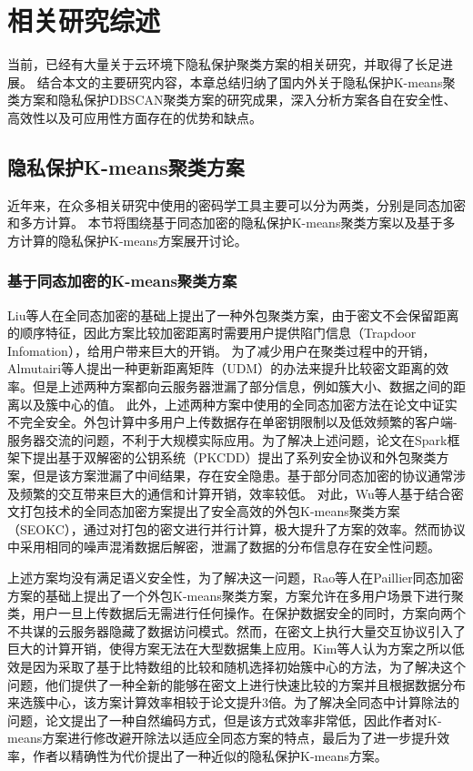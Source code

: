 \chapter{相关研究综述}
当前，已经有大量关于云环境下隐私保护聚类方案的相关研究，并取得了长足进展。
结合本文的主要研究内容，本章总结归纳了国内外关于隐私保护K-means聚类方案和隐私保护DBSCAN聚类方案的研究成果，深入分析方案各自在安全性、高效性以及可应用性方面存在的优势和缺点。

\section{隐私保护K-means聚类方案}
近年来，在众多相关研究中使用的密码学工具主要可以分为两类，分别是同态加密和多方计算。
本节将围绕基于同态加密的隐私保护K-means聚类方案以及基于多方计算的隐私保护K-means方案展开讨论。

\subsection{基于同态加密的K-means聚类方案}
Liu等人\cite{liu2014privacy}在全同态加密的基础上提出了一种外包聚类方案，由于密文不会保留距离的顺序特征，因此方案比较加密距离时需要用户提供陷门信息（Trapdoor Infomation），给用户带来巨大的开销。 
为了减少用户在聚类过程中的开销，Almutairi等人\cite{almutairi2017k}提出一种更新距离矩阵（UDM）的办法来提升比较密文距离的效率。但是上述两种方案都向云服务器泄漏了部分信息，例如簇大小、数据之间的距离以及簇中心的值。
此外，上述两种方案中使用的全同态加密方法在论文\cite{wang2015notes}中证实不完全安全。外包计算中多用户上传数据存在单密钥限制以及低效频繁的客户端-服务器交流的问题，不利于大规模实际应用。为了解决上述问题，论文\cite{rong2017privacy}在Spark框架下提出基于双解密的公钥系统（PKCDD）提出了系列安全协议和外包聚类方案，但是该方案泄漏了中间结果，存在安全隐患。基于部分同态加密的协议通常涉及频繁的交互带来巨大的通信和计算开销，效率较低。
对此，Wu等人\cite{wu2020secure}基于结合密文打包技术的全同态加密方案提出了安全高效的外包K-means聚类方案（SEOKC），通过对打包的密文进行并行计算，极大提升了方案的效率。然而协议中采用相同的噪声混淆数据后解密，泄漏了数据的分布信息存在安全性问题。

上述方案均没有满足语义安全性，为了解决这一问题，Rao等人\cite{rao2015privacy}在Paillier同态加密方案的基础上提出了一个外包K-means聚类方案，方案允许在多用户场景下进行聚类，用户一旦上传数据后无需进行任何操作。在保护数据安全的同时，方案向两个不共谋的云服务器隐藏了数据访问模式。然而，在密文上执行大量交互协议引入了巨大的计算开销，使得方案无法在大型数据集上应用。Kim等人\cite{kim2018privacy}认为方案\cite{rao2015privacy}之所以低效是因为采取了基于比特数组的比较和随机选择初始簇中心的方法，为了解决这个问题，他们提供了一种全新的能够在密文上进行快速比较的方案并且根据数据分布来选簇中心，该方案计算效率相较于论文\cite{rao2015privacy}提升3倍。为了解决全同态中计算除法的问题，论文\cite{jaschke2019unsupervised}提出了一种自然编码方式，但是该方式效率非常低，因此作者对K-means方案进行修改避开除法以适应全同态方案的特点，最后为了进一步提升效率，作者以精确性为代价提出了一种近似的隐私保护K-means方案。

